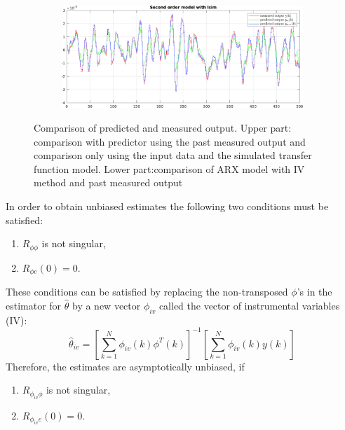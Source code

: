 \documentclass{scrartcl}
\begin{document}
\begin{figure}[h!]
\begin{subfigure}{.49\textwidth}
		\label{fig:output_lsim2}
	\end{subfigure}
	\begin{subfigure}{\textwidth}
		\vspace*{1cm}
		\includegraphics[width=\textwidth]{figures/arx_iv.pdf}
		 \label{fig:output_arx_iv}
	\end{subfigure}
	\caption{Comparison of predicted and measured output. Upper part: comparison with predictor using the past measured output and comparison only using the input data and the simulated transfer function model. Lower part:comparison of ARX model with IV method and past measured output}
\end{figure}
In order to obtain unbiased estimates the following two conditions must be satisfied: 
\begin{enumerate}
\item $R_{\phi \phi}$ is not singular,
\item $R_{\phi e }(0) = 0$.
\end{enumerate}
These conditions can be satisfied by replacing the non-transposed $\phi$'s in the estimator for $\hat{\theta}$ by a new vector $\phi_{iv}$ called the vector of  instrumental variables (IV):
\begin{equation}
	\hat{\theta}_{iv} = \left[ \sum\limits_{k=1}^N \phi_{iv}(k)\phi^T(k) \right]^{-1} \left[\sum\limits_{k=1}^N \phi_{iv}(k) y(k) \right]
\end{equation}
Therefore, the estimates are asymptotically unbiased, if 
\begin{enumerate}
	\item $R_{\phi_{iv} \phi}$ is not singular,
	\item $R_{\phi_{iv} e }(0) = 0$.
\end{enumerate}
\end{document}
